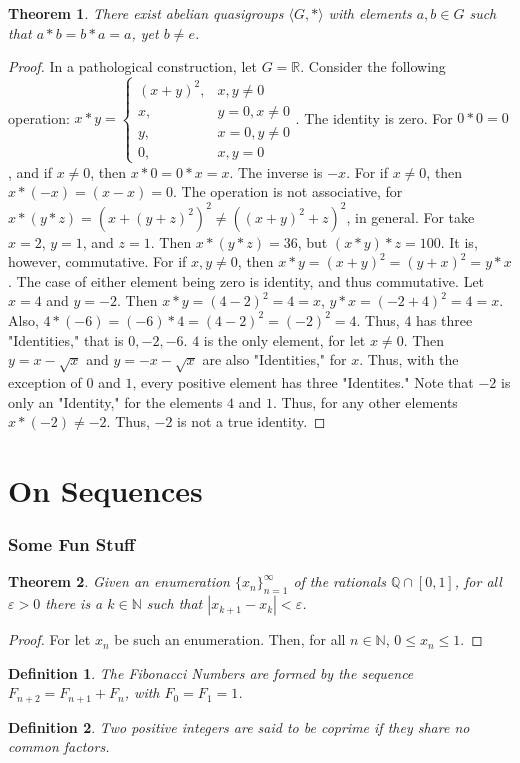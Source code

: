 \documentclass[12pt,oneside]{book}
\theoremstyle{mystyle}
\newtheorem{theorem}{Theorem}[section]
\newtheorem{definition}{Definition}[section]
\begin{document}
\begin{theorem}
There exist abelian quasigroups $\langle G,*\rangle$ with elements $a,b\in G$ such that $a*b = b*a = a$, yet $b\ne e$.
\end{theorem}
\begin{proof}
In a pathological construction, let $G=\mathbb{R}$. Consider the following operation:
$x* y = \begin{cases} (x+y)^2, & x,y\ne 0 \\ x, & y=0,x\ne 0 \\ y, & x=0,y\ne 0 \\ 0, & x,y=0 \end{cases}$.
The identity is zero. For $0*0 = 0$, and if $x\ne 0$, then $x*0 = 0*x = x$. The inverse is $-x$. For if $x\ne 0$, then $x*(-x) = (x-x)=0$. The operation is not associative, for $x*(y*z) = (x+(y+z)^2)^2 \ne ((x+y)^2+z)^2$, in general. For take $x=2$, $y=1$, and $z=1$. Then $x*(y*z) = 36$, but $(x*y)*z = 100$. It is, however, commutative. For if $x,y \ne 0$, then $x*y = (x+y)^2 = (y+x)^2 = y*x$. The case of either element being zero is identity, and thus commutative. Let $x=4$ and $y=-2$. Then $x*y = (4-2)^2 = 4=x$, $y*x = (-2+4)^2 = 4 = x$. Also, $4*(-6) = (-6)*4 = (4-2)^2 = (-2)^2 = 4$. Thus, $4$ has three "Identities," that is $0,-2,-6$. $4$ is the only element, for let $x \ne 0$. Then $y = x-\sqrt{x}$ and $y=-x-\sqrt{x}$ are also "Identities," for $x$. Thus, with the exception of $0$ and $1$, every positive element has three "Identites." Note that $-2$ is only an "Identity," for the elements $4$ and $1$. Thus, for any other elements $x*(-2) \ne -2$. Thus, $-2$ is not a true identity.
\end{proof}
%
\section{On Sequences}
%
\subsubsection{Some Fun Stuff}
%
\begin{theorem}
Given an enumeration $\{x_n\}_{n=1}^{\infty}$ of the rationals $\mathbb{Q}\cap [0,1]$, for all $\varepsilon>0$ there is a $k\in \mathbb{N}$ such that $|x_{k+1}-x_k|<\varepsilon$.
\end{theorem}
\begin{proof}
For let $x_n$ be such an enumeration. Then, for all $n\in \mathbb{N}$, $0 \leq x_n \leq 1$.
\end{proof}
%
\begin{definition}
The Fibonacci Numbers are formed by the sequence $F_{n+2}=F_{n+1}+F_{n}$, with $F_0=F_1 = 1$.
\end{definition}
%
\begin{definition}
Two positive integers are said to be coprime if they share no common factors.
\end{definition}
\end{document}
